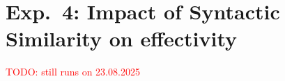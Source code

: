 \section{Exp.\ 4: Impact of Syntactic Similarity on \impApprTitle{} effectivity}
\label{sec:res_syn_sim_impact}

\textcolor{red}{TODO: still runs on 23.08.2025}

%     

%     

%     

%     

%     

%     
